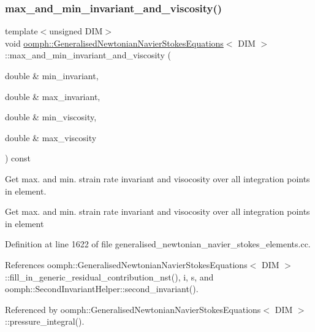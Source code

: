 \subsubsection{\texorpdfstring{max\+\_\+and\+\_\+min\+\_\+invariant\+\_\+and\+\_\+viscosity()}{max\_and\_min\_invariant\_and\_viscosity()}}
{\footnotesize\ttfamily template$<$unsigned D\+IM$>$ \\
void \hyperlink{classoomph_1_1GeneralisedNewtonianNavierStokesEquations}{oomph\+::\+Generalised\+Newtonian\+Navier\+Stokes\+Equations}$<$ D\+IM $>$\+::max\+\_\+and\+\_\+min\+\_\+invariant\+\_\+and\+\_\+viscosity (\begin{DoxyParamCaption}\item[{double \&}]{min\+\_\+invariant,  }\item[{double \&}]{max\+\_\+invariant,  }\item[{double \&}]{min\+\_\+viscosity,  }\item[{double \&}]{max\+\_\+viscosity }\end{DoxyParamCaption}) const}



Get max. and min. strain rate invariant and visocosity over all integration points in element. 

Get max. and min. strain rate invariant and visocosity over all integration points in element 

Definition at line 1622 of file generalised\+\_\+newtonian\+\_\+navier\+\_\+stokes\+\_\+elements.\+cc.



References oomph\+::\+Generalised\+Newtonian\+Navier\+Stokes\+Equations$<$ D\+I\+M $>$\+::fill\+\_\+in\+\_\+generic\+\_\+residual\+\_\+contribution\+\_\+nst(), i, s, and oomph\+::\+Second\+Invariant\+Helper\+::second\+\_\+invariant().



Referenced by oomph\+::\+Generalised\+Newtonian\+Navier\+Stokes\+Equations$<$ D\+I\+M $>$\+::pressure\+\_\+integral().

\mbox{\label{classoomph_1_1GeneralisedNewtonianNavierStokesEquations_a11f3a8c7d6fb7b9d1b915241c0ad1884}} 
